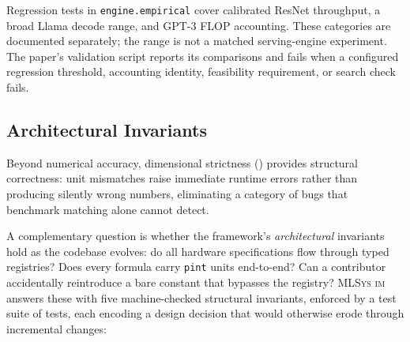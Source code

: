 \documentclass[10pt,twocolumn]{article}
\newcommand{\mlsysim}{\mbox{\textsc{MLSys}\,\textperiodcentered\,\textsc{im}}\xspace}
\begin{document}
Regression tests in \texttt{engine.empirical} cover calibrated ResNet throughput, a broad Llama decode range, and GPT-3 FLOP accounting. These categories are documented separately; the range is not a matched serving-engine experiment. The paper's validation script reports its comparisons and fails when a configured regression threshold, accounting identity, feasibility requirement, or search check fails.

\subsection{Architectural Invariants}
\label{sec:validation-dim}
\label{sec:validation-ratchets}

Beyond numerical accuracy, dimensional strictness () provides structural correctness: unit mismatches raise immediate runtime errors rather than producing silently wrong numbers, eliminating a category of bugs that benchmark matching alone cannot detect.

A complementary question is whether the framework's \emph{architectural} invariants hold as the codebase evolves: do all hardware specifications flow through typed registries? Does every formula carry \texttt{pint} units end-to-end? Can a contributor accidentally reintroduce a bare constant that bypasses the registry? \mlsysim answers these with five machine-checked structural invariants, enforced by a test suite of \CountTests{} tests, each encoding a design decision that would otherwise erode through incremental changes:
\end{document}
